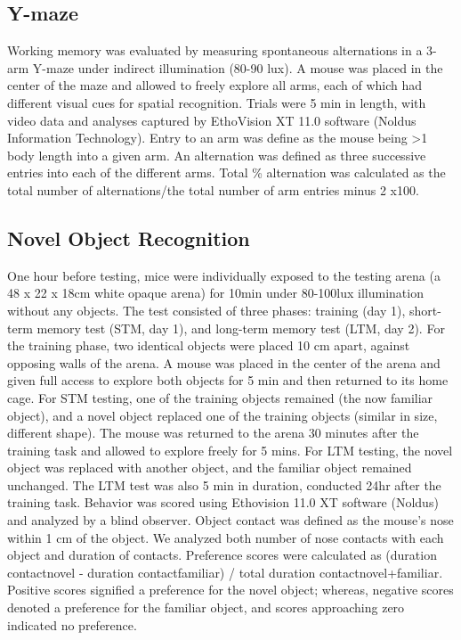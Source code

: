 \subsection{Y-maze}
Working memory was evaluated by measuring spontaneous
alternations in a 3-arm Y-maze under indirect illumination (80-90 lux). A mouse
was placed in the center of the maze and allowed to freely explore all arms,
each of which had different visual cues for spatial recognition. Trials were 5
min in length, with video data and analyses captured by EthoVision XT 11.0
software (Noldus Information Technology). Entry to an arm was define as the
mouse being >1 body length into a given arm. An alternation was defined as three
successive entries into each of the different arms. Total \% alternation was
calculated as the total number of alternations/the total number of arm entries
minus 2 x100.  

\subsection{Novel Object Recognition}
One hour before testing, mice were individually exposed to the testing arena (a 48 x 22 x 18cm white opaque arena)
for 10min under 80-100lux illumination without any objects. The test consisted
of three phases: training (day 1), short-term memory test (STM, day 1), and
long-term memory test (LTM, day 2). For the training phase, two identical
objects were placed 10 cm apart, against opposing walls of the arena. A mouse
was placed in the center of the arena and given full access to explore both
objects for 5 min and then returned to its home cage. For STM testing, one of
the training objects remained (the now familiar object), and a novel object
replaced one of the training objects (similar in size, different shape). The
mouse was returned to the arena 30 minutes after the training task and allowed
to explore freely for 5 mins. For LTM testing, the novel object was replaced
with another object, and the familiar object remained unchanged. The LTM test
was also 5 min in duration, conducted 24hr after the training task. Behavior was
scored using Ethovision 11.0 XT software (Noldus) and analyzed by a blind
observer. Object contact was defined as the mouse’s nose within 1 cm of the
object. We analyzed both number of nose contacts with each object and duration
of contacts. Preference scores were calculated as (duration contactnovel -
duration contactfamiliar) / total duration contactnovel+familiar. Positive
scores signified a preference for the novel object; whereas, negative scores
denoted a preference for the familiar object, and scores approaching zero
indicated no preference.  

